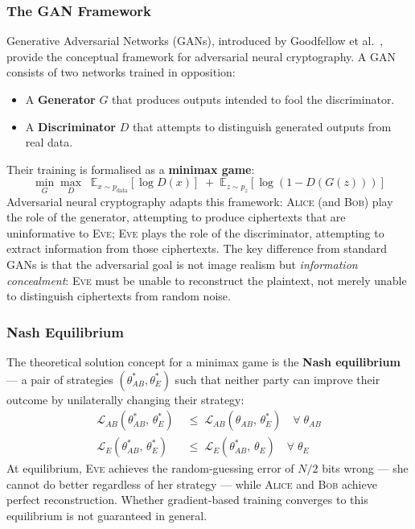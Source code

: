 \documentclass[12pt, a4paper]{article}
\newcommand{\alice}{\textsc{Alice}}
\newcommand{\bob}{\textsc{Bob}}
\newcommand{\eve}{\textsc{Eve}}
\begin{document}
\subsubsection*{The GAN Framework}

Generative Adversarial Networks (GANs), introduced by Goodfellow et
al.~\cite{goodfellow2014generative}, provide the conceptual framework
for adversarial neural cryptography. A GAN consists of two networks
trained in opposition:

\begin{itemize}[leftmargin=1.8em, itemsep=4pt]
  \item A \textbf{Generator} $G$ that produces outputs intended to fool
        the discriminator.
  \item A \textbf{Discriminator} $D$ that attempts to distinguish
        generated outputs from real data.
\end{itemize}

\noindent Their training is formalised as a \textbf{minimax game}:
%
\begin{equation}
  \min_G \max_D \;\;
  \mathbb{E}_{x \sim p_{\text{data}}}[\log D(x)]
  \;+\;
  \mathbb{E}_{z \sim p_z}[\log(1 - D(G(z)))]
  \label{eq:gan_minimax}
\end{equation}
%
Adversarial neural cryptography adapts this framework: \alice{} (and
\bob{}) play the role of the generator, attempting to produce ciphertexts
that are uninformative to \eve{}; \eve{} plays the role of the
discriminator, attempting to extract information from those ciphertexts.
The key difference from standard GANs is that the adversarial goal is
not image realism but \emph{information concealment}: \eve{} must be
unable to reconstruct the plaintext, not merely unable to distinguish
ciphertexts from random noise.

\subsubsection*{Nash Equilibrium}

The theoretical solution concept for a minimax game is the
\textbf{Nash equilibrium} — a pair of strategies $(\theta^*_{\!AB},
\theta^*_{\!E})$ such that neither party can improve their outcome by
unilaterally changing their strategy:
%
\begin{align}
  \mathcal{L}_{AB}(\theta^*_{\!AB},\, \theta^*_{\!E})
    &\;\leq\; \mathcal{L}_{AB}(\theta_{AB},\, \theta^*_{\!E})
    \quad \forall\; \theta_{AB}
    \label{eq:nash_ab} \\[4pt]
  \mathcal{L}_{E}(\theta^*_{\!AB},\, \theta^*_{\!E})
    &\;\leq\; \mathcal{L}_{E}(\theta^*_{\!AB},\, \theta_E)
    \quad \forall\; \theta_E
    \label{eq:nash_e}
\end{align}
%
At equilibrium, \eve{} achieves the random-guessing error of $N/2$ bits
wrong — she cannot do better regardless of her strategy — while \alice{}
and \bob{} achieve perfect reconstruction. Whether gradient-based
training converges to this equilibrium is not guaranteed in general.
\end{document}
